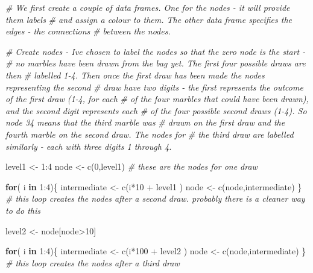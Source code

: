 \documentclass[
]{book}
\newenvironment{Shaded}{\begin{snugshade}}{\end{snugshade}}
\newcommand{\CommentTok}[1]{\textcolor[rgb]{0.56,0.35,0.01}{\textit{#1}}}
\newcommand{\ControlFlowTok}[1]{\textcolor[rgb]{0.13,0.29,0.53}{\textbf{#1}}}
\newcommand{\DecValTok}[1]{\textcolor[rgb]{0.00,0.00,0.81}{#1}}
\newcommand{\FunctionTok}[1]{\textcolor[rgb]{0.00,0.00,0.00}{#1}}
\newcommand{\NormalTok}[1]{#1}
\newcommand{\OtherTok}[1]{\textcolor[rgb]{0.56,0.35,0.01}{#1}}
\newcommand{\SpecialCharTok}[1]{\textcolor[rgb]{0.00,0.00,0.00}{#1}}
\begin{document}
\begin{Shaded}
\begin{Highlighting}[]
\CommentTok{\# We first create a couple of data frames. One for the nodes {-} it will provide them labels }
\CommentTok{\# and assign a colour to them. The other data frame specifies the edges {-} the connections }
\CommentTok{\# between the nodes.}

\CommentTok{\# Create nodes {-} I\textquotesingle{}ve chosen to label the nodes so that the zero node is the start {-} }
\CommentTok{\# no marbles have been drawn from the bag yet. The first four possible draws are then }
\CommentTok{\# labelled 1{-}4. Then once the first draw has been made the nodes representing the second }
\CommentTok{\# draw have two digits {-} the first represents the outcome of the first draw (1{-}4, for each }
\CommentTok{\# of the four marbles that could have been drawn), and the second digit represents each }
\CommentTok{\# of the four possible second draws (1{-}4). So node 34 means that the third marble was }
\CommentTok{\# drawn on the first draw and the fourth marble on the second draw. The nodes for }
\CommentTok{\# the third draw are labelled similarly {-} each with three digits 1 through 4.}

\NormalTok{level1 }\OtherTok{\textless{}{-}} \DecValTok{1}\SpecialCharTok{:}\DecValTok{4} 
\NormalTok{node }\OtherTok{\textless{}{-}} \FunctionTok{c}\NormalTok{(}\DecValTok{0}\NormalTok{,level1) }\CommentTok{\# these are the nodes for one draw}

\ControlFlowTok{for}\NormalTok{( i }\ControlFlowTok{in} \DecValTok{1}\SpecialCharTok{:}\DecValTok{4}\NormalTok{)\{}
\NormalTok{  intermediate }\OtherTok{\textless{}{-}} \FunctionTok{c}\NormalTok{(i}\SpecialCharTok{*}\DecValTok{10} \SpecialCharTok{+}\NormalTok{ level1 )}
\NormalTok{  node }\OtherTok{\textless{}{-}} \FunctionTok{c}\NormalTok{(node,intermediate)}
\NormalTok{\} }\CommentTok{\# this loop creates the nodes after a second draw. probably there is a cleaner way to do this}

\NormalTok{level2 }\OtherTok{\textless{}{-}}\NormalTok{ node[node}\SpecialCharTok{\textgreater{}}\DecValTok{10}\NormalTok{]}

\ControlFlowTok{for}\NormalTok{( i }\ControlFlowTok{in} \DecValTok{1}\SpecialCharTok{:}\DecValTok{4}\NormalTok{)\{}
\NormalTok{  intermediate }\OtherTok{\textless{}{-}} \FunctionTok{c}\NormalTok{(i}\SpecialCharTok{*}\DecValTok{100} \SpecialCharTok{+}\NormalTok{ level2 )}
\NormalTok{  node }\OtherTok{\textless{}{-}} \FunctionTok{c}\NormalTok{(node,intermediate)}
\NormalTok{\} }\CommentTok{\# this loop creates the nodes after a third draw}


\end{Highlighting}
\end{Shaded}
\end{document}
